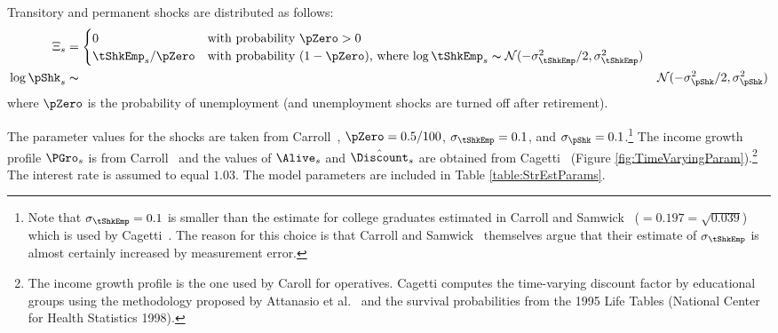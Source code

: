\documentclass[titlepage]{\econtex}
\begin{document}
  Transitory and permanent shocks are distributed as follows:
  \begin{equation}\begin{gathered}\begin{aligned}
    \Xi_{s} & = 
               \begin{cases}
                 0\phantom{/\pZero} & \text{with probability $\pZero>0$} \\
                 \tShkEmp_{s}/\pZero      & \text{with probability $(1-\pZero)$, where $\log \tShkEmp_{s}\thicksim \mathcal{N}(-\sigma_{\tShkEmp}^{2}/2,\sigma_{\tShkEmp}^{2})$}\\
               \end{cases}\\
    \log \pShk_{s} &\thicksim& \mathcal{N}(-\sigma_{\pShk}^{2}/2,\sigma_{\pShk}^{2})
  \end{aligned}\end{gathered}\end{equation}
  where $\pZero$ is the probability of unemployment (and unemployment shocks are turned off after retirement).

  The parameter values for the shocks are taken from Carroll~\citeyearpar{carroll:brookings}, $\pZero=0.5/100$, $\sigma _{\tShkEmp }=0.1$, and $\sigma_{\pShk}=0.1$.\footnote{Note that $\sigma _{\tShkEmp}=0.1$ is smaller than the estimate for college graduates estimated in
    Carroll and Samwick~\citeyearpar{carroll&samwick:nature} ($=0.197=\sqrt{0.039}$) which is used by Cagetti~\citeyearpar{cagettiWprofiles}. The reason for this choice is that Carroll and Samwick~\citeyearpar{carroll&samwick:nature} themselves argue that their estimate of $\sigma_{\tShkEmp }$ is almost certainly increased by measurement error.} The income growth profile $\PGro_{s}$ is from Carroll~\citeyearpar{carrollBSLCPIH} and the values of $\Alive_{s}$ and $\hat{\Discount}_{s}$ are obtained from Cagetti~\citeyearpar{cagettiWprofiles} (Figure \ref{fig:TimeVaryingParam}).\footnote{The income growth profile is the one used by Caroll for operatives. Cagetti computes the time-varying discount factor by educational groups using the methodology proposed by Attanasio et al.~\citeyearpar{AttanasioBanksMeghirWeber} and the survival probabilities from the 1995 Life Tables (National Center for Health Statistics 1998).} The interest rate is assumed to equal $1.03$. The model parameters are included in Table \ref{table:StrEstParams}.
\end{document}
